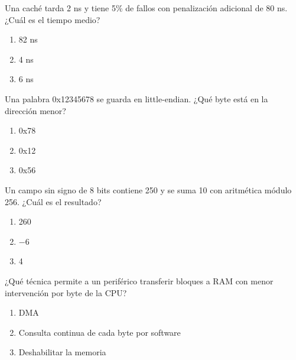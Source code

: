 \noindent\begin{minipage}{\linewidth}\setlength{\parskip}{4pt}\label{q:H-032}
Una caché tarda 2 ns y tiene 5\% de fallos con penalización adicional de 80 ns. ¿Cuál es el tiempo medio?
\begin{enumerate}[label=\Alph*),nosep]
\item 82 ns
\item 4 ns
\item 6 ns
\end{enumerate}\end{minipage}\par\medskip

\noindent\begin{minipage}{\linewidth}\setlength{\parskip}{4pt}\label{q:H-033}
Una palabra 0x12345678 se guarda en little-endian. ¿Qué byte está en la dirección menor?
\begin{enumerate}[label=\Alph*),nosep]
\item 0x78
\item 0x12
\item 0x56
\end{enumerate}\end{minipage}\par\medskip

\noindent\begin{minipage}{\linewidth}\setlength{\parskip}{4pt}\label{q:H-034}
Un campo sin signo de 8 bits contiene 250 y se suma 10 con aritmética módulo 256. ¿Cuál es el resultado?
\begin{enumerate}[label=\Alph*),nosep]
\item 260
\item −6
\item 4
\end{enumerate}\end{minipage}\par\medskip

\noindent\begin{minipage}{\linewidth}\setlength{\parskip}{4pt}\label{q:H-035}
¿Qué técnica permite a un periférico transferir bloques a RAM con menor intervención por byte de la CPU?
\begin{enumerate}[label=\Alph*),nosep]
\item DMA
\item Consulta continua de cada byte por software
\item Deshabilitar la memoria
\end{enumerate}\end{minipage}\par\medskip

